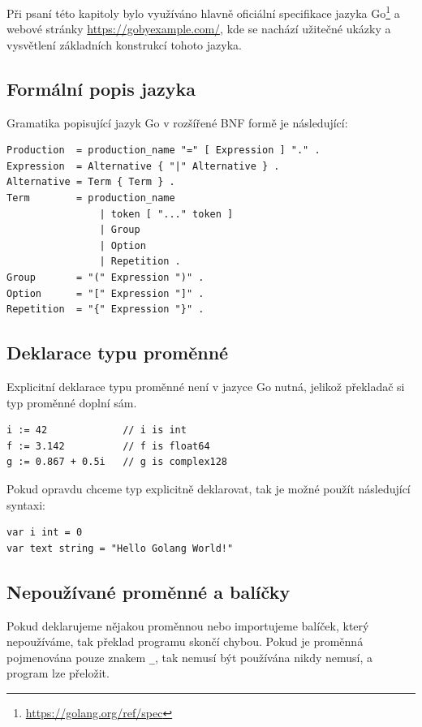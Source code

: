 \documentclass[12pt, a4paper]{article}
\begin{document}
Při psaní této kapitoly bylo využíváno hlavně oficiální specifikace jazyka Go\footnote{\url{https://golang.org/ref/spec}} a webové stránky \url{https://gobyexample.com/}, kde se nachází užitečné ukázky a vysvětlení základních konstrukcí tohoto jazyka.

\subsection{Formální popis jazyka}
Gramatika popisující jazyk Go v rozšířené BNF formě je následující:

\begin{lstlisting}
Production  = production_name "=" [ Expression ] "." .
Expression  = Alternative { "|" Alternative } .
Alternative = Term { Term } .
Term        = production_name 
                | token [ "..." token ] 
                | Group 
                | Option 
                | Repetition .
Group       = "(" Expression ")" .
Option      = "[" Expression "]" .
Repetition  = "{" Expression "}" .

\end{lstlisting}

\subsection{Deklarace typu proměnné}
Explicitní deklarace typu proměnné není v jazyce Go nutná, jelikož překladač si typ proměnné doplní sám.


\begin{lstlisting}[caption={Typ proměnné nemusí být v kódu explicitně deklarován}, captionpos=b]
i := 42             // i is int
f := 3.142          // f is float64
g := 0.867 + 0.5i   // g is complex128
\end{lstlisting}

\noindent Pokud opravdu chceme typ explicitně deklarovat, tak je možné použít následující syntaxi:

\begin{lstlisting}[caption={Explicitní deklarace typu proměnné}, captionpos=b, language=Golang]
var i int = 0
var text string = "Hello Golang World!"
\end{lstlisting}


\subsection{Nepoužívané proměnné a balíčky}
Pokud deklarujeme nějakou proměnnou nebo importujeme balíček, který nepoužíváme, tak překlad programu skončí chybou. Pokud je proměnná pojmenována pouze znakem \texttt{_}, tak nemusí být používána nikdy nemusí, a program lze přeložit.
\end{document}
